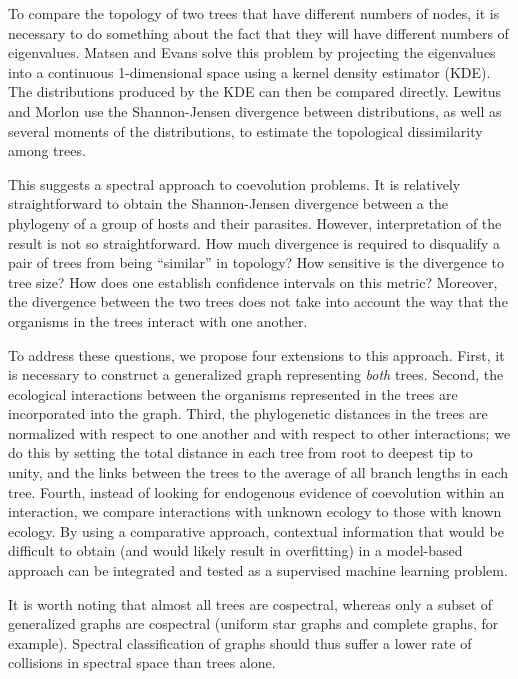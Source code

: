 To compare the topology of two trees that have different numbers of nodes, it is necessary to do something about the fact that they will have different numbers of eigenvalues. Matsen and Evans \cite{matsen2012ubiquity} solve this problem by projecting the eigenvalues into a continuous 1-dimensional space using a kernel density estimator (KDE). The distributions produced by the KDE can then be compared directly. Lewitus and Morlon \cite{lewitus2015characterizing} use the Shannon-Jensen divergence between distributions, as well as several moments of the distributions, to estimate the topological dissimilarity among trees.  

This suggests a spectral approach to coevolution problems. It is relatively straightforward to obtain the Shannon-Jensen divergence between a the phylogeny of a group of hosts and their parasites. However, interpretation of the result is not so straightforward. How much divergence is required to disqualify a pair of trees from being ``similar'' in topology? How sensitive is the divergence to tree size? How does one establish confidence intervals on this metric? Moreover, the divergence between the two trees does not take into account the way that the organisms in the trees interact with one another. 

To address these questions, we propose four extensions to this approach. First, it is necessary to construct a generalized graph representing {\em both} trees. Second, the ecological interactions between the organisms represented in the trees are incorporated into the graph. Third, the phylogenetic distances in the trees are normalized with respect to one another and with respect to other interactions; we do this by setting the total distance in each tree from root to deepest tip to unity, and the links between the trees to the average of all branch lengths in each tree. Fourth, instead of looking for endogenous evidence of coevolution within an interaction, we compare interactions with unknown ecology to those with known ecology. By using a comparative approach, contextual information that would be difficult to obtain (and would likely result in overfitting) in a model-based approach can be integrated and tested as a supervised machine learning problem.

It is worth noting that almost all trees are cospectral, \cite{schwenk1973almost} whereas only a subset of generalized graphs are cospectral (uniform star graphs and complete graphs, for example). Spectral classification of graphs should thus suffer a lower rate of collisions in spectral space than trees alone. 
